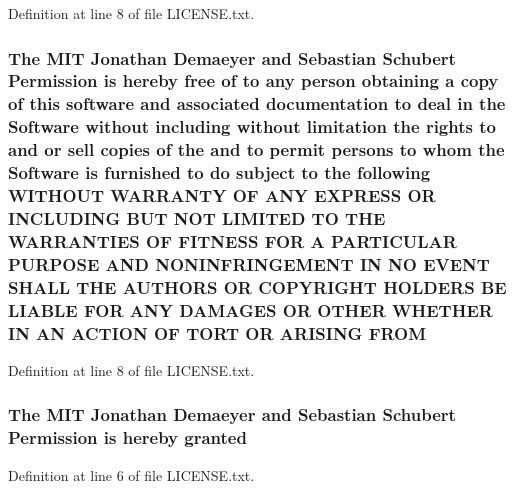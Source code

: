 Definition at line 8 of file L\+I\+C\+E\+N\+S\+E.\+txt.

\subsubsection[{\texorpdfstring{F\+R\+OM}{FROM}}]{\setlength{\rightskip}{0pt plus 5cm}The M\+IT Jonathan Demaeyer and Sebastian Schubert Permission is hereby free of to any person obtaining a {\bf copy} of this software and associated documentation to deal in the {\bf Software} without including without limitation the rights to and or sell copies of the and to permit persons to whom the {\bf Software} is furnished to do subject to the following W\+I\+T\+H\+O\+UT W\+A\+R\+R\+A\+N\+TY OF A\+NY E\+X\+P\+R\+E\+SS OR I\+N\+C\+L\+U\+D\+I\+NG B\+UT N\+OT L\+I\+M\+I\+T\+ED TO T\+HE W\+A\+R\+R\+A\+N\+T\+I\+ES OF F\+I\+T\+N\+E\+SS F\+OR A P\+A\+R\+T\+I\+C\+U\+L\+AR P\+U\+R\+P\+O\+SE A\+ND N\+O\+N\+I\+N\+F\+R\+I\+N\+G\+E\+M\+E\+NT IN NO E\+V\+E\+NT S\+H\+A\+LL T\+HE A\+U\+T\+H\+O\+RS OR C\+O\+P\+Y\+R\+I\+G\+HT H\+O\+L\+D\+E\+RS BE L\+I\+A\+B\+LE F\+OR A\+NY D\+A\+M\+A\+G\+ES OR O\+T\+H\+ER W\+H\+E\+T\+H\+ER IN AN A\+C\+T\+I\+ON OF T\+O\+RT OR A\+R\+I\+S\+I\+NG F\+R\+OM}\hypertarget{LICENSE_8txt_a865c822002b6ef9423cdcedd61206bb6}{}\label{LICENSE_8txt_a865c822002b6ef9423cdcedd61206bb6}


Definition at line 8 of file L\+I\+C\+E\+N\+S\+E.\+txt.

\subsubsection[{\texorpdfstring{granted}{granted}}]{\setlength{\rightskip}{0pt plus 5cm}The M\+IT Jonathan Demaeyer and Sebastian Schubert Permission is hereby granted}\hypertarget{LICENSE_8txt_ac7e44340bb6146ecd6a7c8a53e31a570}{}\label{LICENSE_8txt_ac7e44340bb6146ecd6a7c8a53e31a570}


Definition at line 6 of file L\+I\+C\+E\+N\+S\+E.\+txt.

